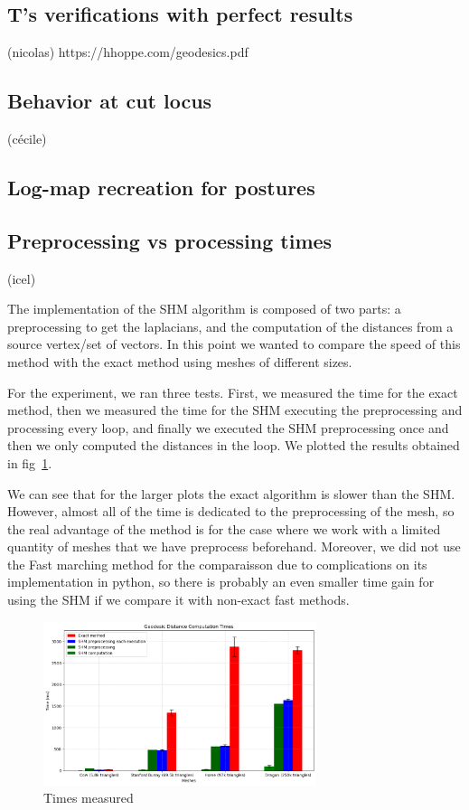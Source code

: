\documentclass[sigconf]{acmart}
\begin{document}
\subsection{T's verifications with perfect results}
(nicolas)
https://hhoppe.com/geodesics.pdf

\subsection{Behavior at cut locus}
(cécile)
\subsection{Log-map recreation for postures}

\subsection{Preprocessing vs processing times}
(icel)

The implementation of the SHM algorithm is composed of two parts:
a preprocessing to get the laplacians, and the computation of the 
distances from a source vertex/set of vectors. In this point we wanted to compare the speed of this method with
the exact method using meshes of different sizes. 

For the experiment, we ran three tests. First, we measured the time for the exact method,
then we measured the time for the SHM executing the preprocessing and processing
every loop, and finally we executed the SHM preprocessing once and then we only computed
the distances in the loop. We plotted the results obtained in fig~\ref{fig:time_graphs}. 

We can see that for the larger plots the exact algorithm is slower than the SHM. 
However, almost all of the time is dedicated to the preprocessing of the mesh, 
so the real advantage of the method is for the case where we work with a limited
quantity of meshes that we have preprocess beforehand. Moreover, we did not
use the Fast marching method for the comparaisson due to complications on its
implementation in python, so there is probably an even smaller time gain for using
the SHM if we compare it with non-exact fast methods.

\begin{figure}
  \centering
  \includegraphics[width=8cm]{time_graphs.png}
  \caption{Times measured}
  \label{fig:time_graphs}
\end{figure}
\end{document}
